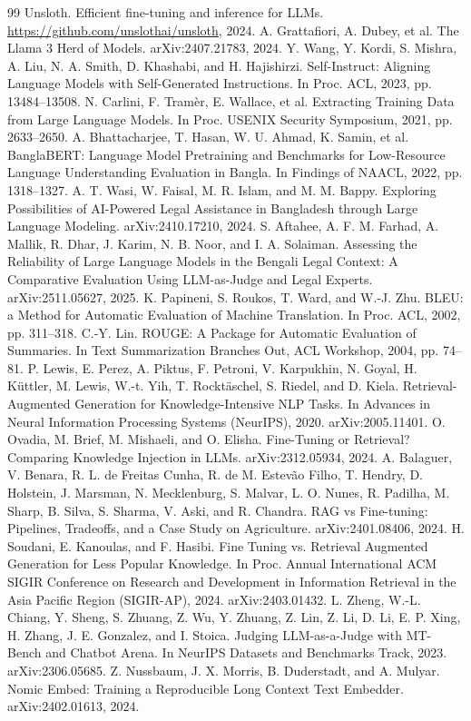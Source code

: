 \documentclass[11pt,a4paper]{article}
\begin{document}
\begin{thebibliography}{99}
 Unsloth. Efficient fine-tuning and inference for LLMs. \url{https://github.com/unslothai/unsloth}, 2024.
 A. Grattafiori, A. Dubey, et al. The Llama 3 Herd of Models. arXiv:2407.21783, 2024.
 Y. Wang, Y. Kordi, S. Mishra, A. Liu, N. A. Smith, D. Khashabi, and H. Hajishirzi. Self-Instruct: Aligning Language Models with Self-Generated Instructions. In Proc. ACL, 2023, pp. 13484--13508.
 N. Carlini, F. Tram\`{e}r, E. Wallace, et al. Extracting Training Data from Large Language Models. In Proc. USENIX Security Symposium, 2021, pp. 2633--2650.
 A. Bhattacharjee, T. Hasan, W. U. Ahmad, K. Samin, et al. BanglaBERT: Language Model Pretraining and Benchmarks for Low-Resource Language Understanding Evaluation in Bangla. In Findings of NAACL, 2022, pp. 1318--1327.
 A. T. Wasi, W. Faisal, M. R. Islam, and M. M. Bappy. Exploring Possibilities of AI-Powered Legal Assistance in Bangladesh through Large Language Modeling. arXiv:2410.17210, 2024.
 S. Aftahee, A. F. M. Farhad, A. Mallik, R. Dhar, J. Karim, N. B. Noor, and I. A. Solaiman. Assessing the Reliability of Large Language Models in the Bengali Legal Context: A Comparative Evaluation Using LLM-as-Judge and Legal Experts. arXiv:2511.05627, 2025.
 K. Papineni, S. Roukos, T. Ward, and W.-J. Zhu. BLEU: a Method for Automatic Evaluation of Machine Translation. In Proc. ACL, 2002, pp. 311--318.
 C.-Y. Lin. ROUGE: A Package for Automatic Evaluation of Summaries. In Text Summarization Branches Out, ACL Workshop, 2004, pp. 74--81.
 P. Lewis, E. Perez, A. Piktus, F. Petroni, V. Karpukhin, N. Goyal, H. K\"{u}ttler, M. Lewis, W.-t. Yih, T. Rockt\"{a}schel, S. Riedel, and D. Kiela. Retrieval-Augmented Generation for Knowledge-Intensive NLP Tasks. In Advances in Neural Information Processing Systems (NeurIPS), 2020. arXiv:2005.11401.
 O. Ovadia, M. Brief, M. Mishaeli, and O. Elisha. Fine-Tuning or Retrieval? Comparing Knowledge Injection in LLMs. arXiv:2312.05934, 2024.
 A. Balaguer, V. Benara, R. L. de Freitas Cunha, R. de M. Estev\~{a}o Filho, T. Hendry, D. Holstein, J. Marsman, N. Mecklenburg, S. Malvar, L. O. Nunes, R. Padilha, M. Sharp, B. Silva, S. Sharma, V. Aski, and R. Chandra. RAG vs Fine-tuning: Pipelines, Tradeoffs, and a Case Study on Agriculture. arXiv:2401.08406, 2024.
 H. Soudani, E. Kanoulas, and F. Hasibi. Fine Tuning vs. Retrieval Augmented Generation for Less Popular Knowledge. In Proc. Annual International ACM SIGIR Conference on Research and Development in Information Retrieval in the Asia Pacific Region (SIGIR-AP), 2024. arXiv:2403.01432.
 L. Zheng, W.-L. Chiang, Y. Sheng, S. Zhuang, Z. Wu, Y. Zhuang, Z. Lin, Z. Li, D. Li, E. P. Xing, H. Zhang, J. E. Gonzalez, and I. Stoica. Judging LLM-as-a-Judge with MT-Bench and Chatbot Arena. In NeurIPS Datasets and Benchmarks Track, 2023. arXiv:2306.05685.
 Z. Nussbaum, J. X. Morris, B. Duderstadt, and A. Mulyar. Nomic Embed: Training a Reproducible Long Context Text Embedder. arXiv:2402.01613, 2024.
\end{thebibliography}
\end{document}

